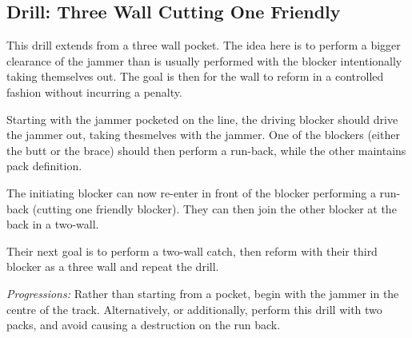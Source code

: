 \subsection*{Drill: Three Wall Cutting One Friendly}
\label{drill:three_wall/cutting_one_friendly}

This drill extends from a three wall pocket.
The idea here is to perform a bigger clearance of the jammer than is usually performed with the blocker intentionally taking themselves out.
The goal is then for the wall to reform in a controlled fashion without incurring a penalty.

Starting with the jammer pocketed on the line, the driving blocker should drive the jammer out, taking thesmelves with the jammer. 
One of the blockers (either the butt or the brace) should then perform a run-back, while the other maintains pack definition. 

The initiating blocker can now re-enter in front of the blocker performing a run-back (cutting one friendly blocker).
They can then join the other blocker at the back in a two-wall.  

Their next goal is to perform a two-wall catch, then reform with their third blocker as a three wall and repeat the drill. 



{\it Progressions:} Rather than starting from a pocket, begin with the jammer in the centre of the track.
Alternatively, or additionally, perform this drill with two packs, and avoid causing a destruction on the run back.


